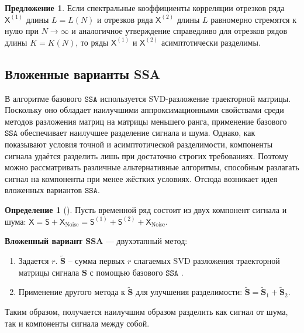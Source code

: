 \documentclass[12pt, specialist, subf
]{disser}
\theoremstyle{definition}
\newcommand{\SSA}{\texttt{SSA}}
\newcommand{\TS}{\mathsf{X}}
\newtheorem{definition}{Определение} %
\newtheorem{proposition}{Предложение}
\begin{document}
\begin{proposition}
	\label{prop:ass_razd}
	Если спектральные коэффициенты корреляции отрезков ряда \( \TS^{(1)} \) длины \( L = L(N) \) и отрезков ряда \( \TS^{(2)} \) длины \( L \) равномерно стремятся к нулю при \( N \to \infty \) и аналогичное утверждение справедливо для отрезков рядов длины \( K = K(N) \), то ряды \( \TS^{(1)} \) и \( \TS^{(2)} \) асимптотически разделимы.
\end{proposition}



\subsection{Вложенные варианты SSA}
\label{sec:eossa_and_autogroup}

В алгоритме базового $\SSA$ используется SVD-разложение траекторной матрицы. Поскольку оно обладает наилучшими аппроксимационными свойствами среди методов разложения матриц на матрицы меньшего ранга, применение базового $\SSA$ обеспечивает наилучшее разделение сигнала и шума. Однако, как показывают условия точной и асимптотической разделимости, компоненты сигнала удаётся разделить лишь при достаточно строгих требованиях. Поэтому можно рассматривать различные альтернативные алгоритмы, способным разлагать сигнал на компоненты при менее жёстких условиях.
Отсюда возникает идея вложенных вариантов $\SSA$.

\begin{definition}[\cite{Golyandina_2015}]

	Пусть временной ряд состоит из двух компонент сигнала и шума: $\TS = \mathsf{S} + \TS_{\mathrm{Noise}}=
		\mathsf{S}^{(1)} + \mathsf{S}^{(2)} + \TS_{\mathrm{Noise}}$.

	\textbf{Вложенный вариант SSA} — двухэтапный метод:
	\begin{enumerate}
		\item Задается $r$. $\tilde {\mathbf{S}}$ -- сумма первых $r$ слагаемых SVD разложения траекторной матрицы сигнала $\mathbf S$ с помощью базового $\SSA$ .
		\item Применение другого метода к $\tilde{\mathbf{S}}$ для улучшения разделимости: $\tilde{\mathbf{S }} = \tilde{\mathbf{S}}_1 + \tilde{\mathbf{S } }_2$.
	\end{enumerate}
\end{definition}


Таким образом, получается наилучшим образом разделить как сигнал от шума, так и компоненты сигнала между собой.
\end{document}
